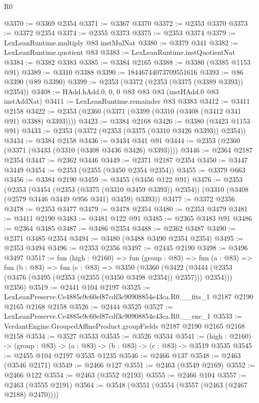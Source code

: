 \begin{lexlean}{R0}
\begin{coremodule}
@3370 := @3369 @2354
@3371 := @3367 @3370
@3372 := @2353 @3370
@3373 := @3372 @2354
@3374 := @2355 @3373
@3375 := @2353 @3374
@3379 := LexLeanRuntime.multiply @83 instMulNat
@3380 := @3379 @341
@3382 := LexLeanRuntime.quotient @83
@3383 := LexLeanRuntime.instQuotientNat
@3384 := @3382 @3383
@3385 := @3384 @2165
@3388 := @3380 (@3385 @1153 @91)
@3389 := @3310 @3388
@3390 := 18446744073709551616
@3393 := @86 @3390 (@89 @3390)
@3399 := @2353 (@3372 (@2353 (@3375 (@3389 @3393)) @2354))
@3408 := HAdd.hAdd.{0, 0, 0} @83 @83 @83 (instHAdd.{0} @83 instAddNat)
@3411 := LexLeanRuntime.remainder @83 @3383
@3412 := @3411 @2158
@3422 := @2353 (@2360 (@3371 (@3399 (@3310 (@3408 (@3412 @341 @91) @3388) @3393))))
@3423 := @3384 @2168
@3426 := @3380 (@3423 @1153 @91)
@3433 := @2353 (@3372 (@2353 (@3375 (@3310 @3426 @3393)) @2354))
@3434 := @3384 @2158
@3436 := @3434 @341 @91
@3444 := @2353 (@2360 (@3371 (@3433 (@3310 (@3408 @3436 @3426) @3393))))
@3446 := @2364 @2187 @2354
@3447 := @2362 @3446
@3449 := @2371 @2187 @2354
@3450 := @3447 @3449
@3454 := @2353 (@2355 (@3450 @2354 @2354))
@3455 := @3379 @663
@3456 := @3384 @2190
@3459 := @3455 (@3456 @122 @91)
@3476 := @2353
    (@2353
      (@3454 (@2353 (@3375 (@3310 @3459 @3393)) @2354))
      (@3310 (@3408 (@2579 @3446 @3449 @956 @341) @3459) @3393))
@3477 := @3372 @2356
@3478 := @2353 @3477
@3479 := @3478 @2354
@3480 := @2353 @3479
@3481 := @3411 @2190
@3483 := @3481 @122 @91
@3485 := @2365 @3483 @91
@3486 := @2364 @3485
@3487 := @3486 @2354
@3488 := @2362 @3487
@3490 := @2371 @3485 @2354
@3494 := @3480 (@3488 @3490 @2354 @2354)
@3495 := @2353 @3494
@3496 := @2353 @2356
@3497 := @2445 @2190
@3498 := @3496 @3497
@3517 := fun (high : @2160) =>
  fun (group : @83) =>
  fun (a : @83) =>
  fun (b : @83) =>
  fun (c : @83) =>
  @3350
    (@3360
      (@3422 (@3444 (@2353 (@3476 (@3495 (@2353 (@2355 (@3450 @3498 @2354)) @2357))) @2354)))
      @2356)
@3519 := @2441 @104 @2197
@3525 := LexLeanPreserve.Ce4885e9c60ef87cdf3c90908854e43ca.R0.__fits_1 @2187 @2190 @2165 @2168 @2158
@3526 := @2444 @3525
@3527 := LexLeanPreserve.Ce4885e9c60ef87cdf3c90908854e43ca.R0.__enc_1
@3533 := VerdantEngine.GroupedAffineProduct.groupFields @2187 @2190 @2165 @2168 @2158
@3534 := @3527 @3533
@3535 := @3526 @3534
@3541 := (high : @2160) -> (group : @83) -> (a : @83) -> (b : @83) -> (c : @83) -> @3519 @3535
@3545 := @2455 @104 @2197 @3535 @1235
@3546 := @2466 @137
@3548 := @2463 (@3546 @2171)
@3549 := @2466 @127
@3551 := @2463 (@3549 @2169)
@3552 := @2466 @122
@3554 := @2463 (@3552 @2193)
@3555 := @2466 @104
@3557 := @2463 (@3555 @2191)
@3564 := @3548 (@3551 (@3554 (@3557 (@2463 (@2467 @2188) @2470))))

\end{coremodule}
\end{lexlean}

